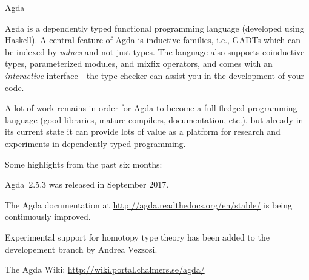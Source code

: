 \begin{hcarentry}[updated]{Agda}
\label{agda}
\makeheader

Agda is a dependently typed functional programming language (developed
using Haskell). A central feature of Agda is inductive families,
i.e., GADTs which can be indexed by \emph{values} and not just types.
The language also supports coinductive types, parameterized modules,
and mixfix operators, and comes with an \emph{interactive}
interface---the type checker can assist you in the development of your
code.

A lot of work remains in order for Agda to become a full-fledged
programming language (good libraries, mature compilers, documentation,
etc.), but already in its current state it can provide lots of value as a
platform for research and experiments in dependently typed programming.

Some highlights from the past six months:
\begin{compactitem}
\item Agda~2.5.3 was released in September 2017.
\item The Agda documentation at
\url{http://agda.readthedocs.org/en/stable/} is being continuously improved.
\item Experimental support for homotopy type theory has been added to the
developement branch by Andrea Vezzosi.
\end{compactitem}

\FurtherReading
  The Agda Wiki: \url{http://wiki.portal.chalmers.se/agda/}
\end{hcarentry}

